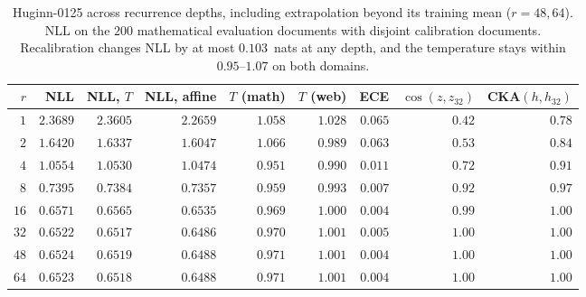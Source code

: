 \begin{table}[t]
\centering
\scriptsize
\begin{tabular}{rrrrrrrrr}
\toprule
$r$ & NLL & NLL, $T$ & NLL, affine & $T$ (math) & $T$ (web) & ECE & $\cos(z, z_{32})$ & CKA$(h, h_{32})$ \\
\midrule
$1$ & $2.3689$ & $2.3605$ & $2.2659$ & $1.058$ & $1.028$ & $0.065$ & $0.42$ & $0.78$ \\
$2$ & $1.6420$ & $1.6337$ & $1.6047$ & $1.066$ & $0.989$ & $0.063$ & $0.53$ & $0.84$ \\
$4$ & $1.0554$ & $1.0530$ & $1.0474$ & $0.951$ & $0.990$ & $0.011$ & $0.72$ & $0.91$ \\
$8$ & $0.7395$ & $0.7384$ & $0.7357$ & $0.959$ & $0.993$ & $0.007$ & $0.92$ & $0.97$ \\
$16$ & $0.6571$ & $0.6565$ & $0.6535$ & $0.969$ & $1.000$ & $0.004$ & $0.99$ & $1.00$ \\
$32$ & $0.6522$ & $0.6517$ & $0.6486$ & $0.970$ & $1.001$ & $0.005$ & $1.00$ & $1.00$ \\
$48$ & $0.6524$ & $0.6519$ & $0.6488$ & $0.971$ & $1.001$ & $0.004$ & $1.00$ & $1.00$ \\
$64$ & $0.6523$ & $0.6518$ & $0.6488$ & $0.971$ & $1.001$ & $0.004$ & $1.00$ & $1.00$ \\
\bottomrule
\end{tabular}
\caption{Huginn-0125 across recurrence depths, including extrapolation beyond its training mean ($r = 48, 64$). NLL on the $200$ mathematical evaluation documents with disjoint calibration documents. Recalibration changes NLL by at most $0.103$~nats at any depth, and the temperature stays within $0.95$--$1.07$ on both domains.}
\label{tab:public-huginn}
\end{table}
